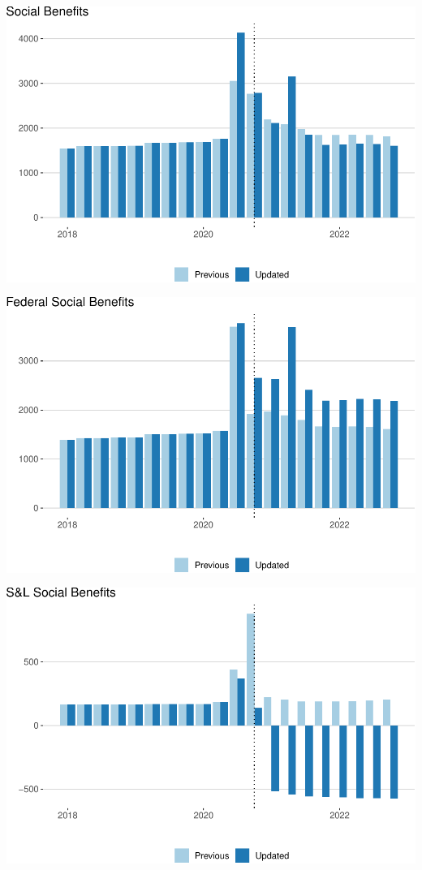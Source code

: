 \documentclass[
]{article}
\begin{document}
\begin{center}\includegraphics{update-changes-levels_files/figure-latex/social-benefits-1} \end{center}

\begin{center}\includegraphics{update-changes-levels_files/figure-latex/federal-social-benefits-1} \end{center}

\begin{center}\includegraphics{update-changes-levels_files/figure-latex/state-social-benefits-1} \end{center}
\end{document}
